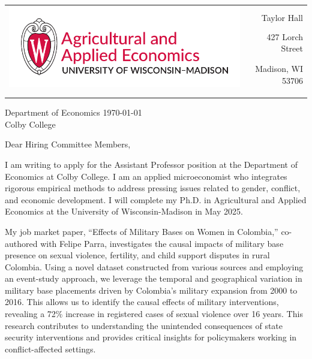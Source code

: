 \documentclass[12pt]{letter}
\begin{document}
\begin{tabularx}{\textwidth}{Xr}
\multirow{4}{*}{\includegraphics[height=3\baselineskip]{logo_cropped.pdf}} &  \\
& Taylor Hall \\
& 427 Lorch Street \\
& Madison, WI 53706 \\
[-1.8ex]\\
\\
\end{tabularx}

Department of Economics \hfill \today \\
Colby College

\medskip

Dear Hiring Committee Members,

I am writing to apply for the Assistant Professor position at the Department of Economics at Colby College. 
I am an applied microeconomist who integrates rigorous empirical methods to address pressing issues related to gender, conflict, and economic development.
I will complete my Ph.D. in Agricultural and Applied Economics at the University of Wisconsin-Madison in May 2025. 

My job market paper, “Effects of Military Bases on Women in Colombia,” co-authored with Felipe Parra, investigates the causal impacts of military base presence 
on sexual violence, fertility, and child support disputes in rural Colombia. Using a novel dataset constructed from various sources and employing an event-study approach, 
we leverage the temporal and geographical variation in military base placements driven by Colombia's military expansion from 2000 to 2016. This allows us to identify 
the causal effects of military interventions, revealing a 72\% increase in registered cases of sexual violence over 16 years. 
This research contributes to understanding the unintended consequences of state security interventions and provides critical insights 
for policymakers working in conflict-affected settings.
\end{document}
